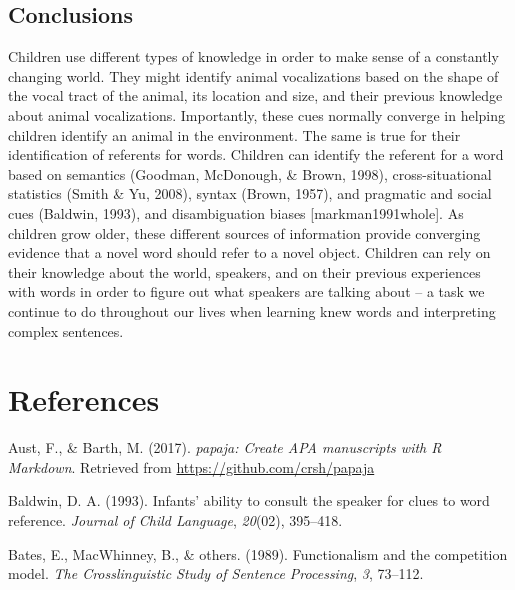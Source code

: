 \documentclass[english,floatsintext,man]{apa6}
\theoremstyle{definition}
\theoremstyle{definition}
\theoremstyle{definition}
\theoremstyle{remark}
\begin{document}
\hypertarget{conclusions}{%
\subsection{Conclusions}\label{conclusions}}

Children use different types of knowledge in order to make sense of a
constantly changing world. They might identify animal vocalizations
based on the shape of the vocal tract of the animal, its location and
size, and their previous knowledge about animal vocalizations.
Importantly, these cues normally converge in helping children identify
an animal in the environment. The same is true for their identification
of referents for words. Children can identify the referent for a word
based on semantics (Goodman, McDonough, \& Brown, 1998),
cross-situational statistics (Smith \& Yu, 2008), syntax (Brown, 1957),
and pragmatic and social cues (Baldwin, 1993), and disambiguation biases
{[}markman1991whole{]}. As children grow older, these different sources
of information provide converging evidence that a novel word should
refer to a novel object. Children can rely on their knowledge about the
world, speakers, and on their previous experiences with words in order
to figure out what speakers are talking about -- a task we continue to
do throughout our lives when learning knew words and interpreting
complex sentences.

\newpage

\hypertarget{references}{%
\section{References}\label{references}}

\setlength{\parindent}{-0.5in}
\setlength{\leftskip}{0.5in}

\hypertarget{refs}{}
\leavevmode\hypertarget{ref-R-papaja}{}%
Aust, F., \& Barth, M. (2017). \emph{papaja: Create APA manuscripts with
R Markdown}. Retrieved from \url{https://github.com/crsh/papaja}

\leavevmode\hypertarget{ref-baldwin1993infants}{}%
Baldwin, D. A. (1993). Infants' ability to consult the speaker for clues
to word reference. \emph{Journal of Child Language}, \emph{20}(02),
395--418.

\leavevmode\hypertarget{ref-bates1989functionalism}{}%
Bates, E., MacWhinney, B., \& others. (1989). Functionalism and the
competition model. \emph{The Crosslinguistic Study of Sentence
Processing}, \emph{3}, 73--112.
\end{document}
